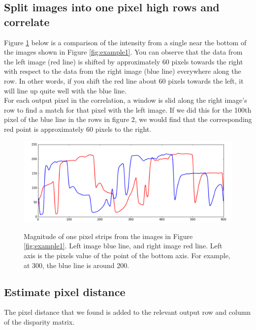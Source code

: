 \documentclass[11pt,fleqn]{article}
\begin{document}
\subsection{Split images into one pixel high rows and correlate}

Figure \ref{fig:strips} below is a comparison of the intensity from a single near the bottom of the images shown in Figure \ref{fig:example1}. You can observe that the data from the left image (red line) is shifted by approximately 60 pixels towards the right with respect to the data from the right image (blue line) everywhere along the row. In other words, if you shift the red line about 60 pixels towards the left, it will line up quite well with the blue line.\\[5pt]
%
For each output pixel in the correlation, a window is slid along the right image's row to find a match for that pixel with the left image. If we did this for the 100th pixel of the blue line in the rows in figure 2, we would find that the corresponding red point is approximately 60 pixels to the right.

\begin{figure}[!h]
\centering
\includegraphics[width=1\textwidth]{images/strips.png} \\[2pt]
\caption[Magnitude of 1 pixel strips from the images in Figure \ref{fig:example1}]{Magnitude of one pixel strips from the images in Figure \ref{fig:example1}. Left image blue line, and right image red line. Left axis is the pixels value of the point of the bottom axis. For example, at 300, the blue line is around 200.
}
\label{fig:strips}
\end{figure}

\subsection{Estimate pixel distance}
The pixel distance that we found is added to the relevant output row and column of the disparity matrix.
\end{document}
